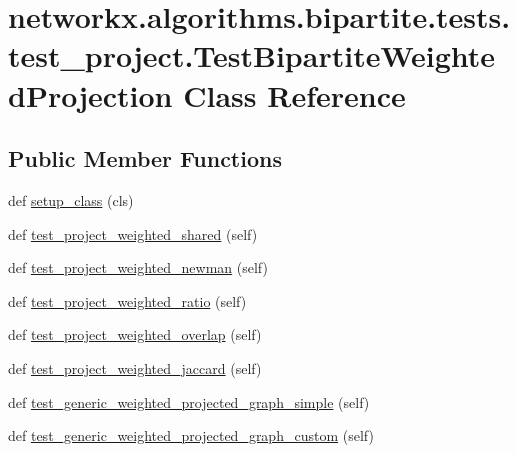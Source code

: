 \hypertarget{classnetworkx_1_1algorithms_1_1bipartite_1_1tests_1_1test__project_1_1TestBipartiteWeightedProjection}{}\section{networkx.\+algorithms.\+bipartite.\+tests.\+test\+\_\+project.\+Test\+Bipartite\+Weighted\+Projection Class Reference}
\label{classnetworkx_1_1algorithms_1_1bipartite_1_1tests_1_1test__project_1_1TestBipartiteWeightedProjection}
\subsection*{Public Member Functions}
\begin{DoxyCompactItemize}
\item 
def \hyperlink{classnetworkx_1_1algorithms_1_1bipartite_1_1tests_1_1test__project_1_1TestBipartiteWeightedProjection_a610c0d9618715508b26f3887442ea98f}{setup\+\_\+class} (cls)
\item 
def \hyperlink{classnetworkx_1_1algorithms_1_1bipartite_1_1tests_1_1test__project_1_1TestBipartiteWeightedProjection_a240fa8424533f59822daa34b510cb748}{test\+\_\+project\+\_\+weighted\+\_\+shared} (self)
\item 
def \hyperlink{classnetworkx_1_1algorithms_1_1bipartite_1_1tests_1_1test__project_1_1TestBipartiteWeightedProjection_a2d93e4b4a460a553d42eb93fb774aad6}{test\+\_\+project\+\_\+weighted\+\_\+newman} (self)
\item 
def \hyperlink{classnetworkx_1_1algorithms_1_1bipartite_1_1tests_1_1test__project_1_1TestBipartiteWeightedProjection_ad06b2350c4025d133dd1aef6fef7dac6}{test\+\_\+project\+\_\+weighted\+\_\+ratio} (self)
\item 
def \hyperlink{classnetworkx_1_1algorithms_1_1bipartite_1_1tests_1_1test__project_1_1TestBipartiteWeightedProjection_aa5d789d0419c5174a79a70762872547a}{test\+\_\+project\+\_\+weighted\+\_\+overlap} (self)
\item 
def \hyperlink{classnetworkx_1_1algorithms_1_1bipartite_1_1tests_1_1test__project_1_1TestBipartiteWeightedProjection_a4df9d179a94bc85e1b7096da74bd4e63}{test\+\_\+project\+\_\+weighted\+\_\+jaccard} (self)
\item 
def \hyperlink{classnetworkx_1_1algorithms_1_1bipartite_1_1tests_1_1test__project_1_1TestBipartiteWeightedProjection_a822e915fce2bb984599728656876e7bc}{test\+\_\+generic\+\_\+weighted\+\_\+projected\+\_\+graph\+\_\+simple} (self)
\item 
def \hyperlink{classnetworkx_1_1algorithms_1_1bipartite_1_1tests_1_1test__project_1_1TestBipartiteWeightedProjection_a6f3763f7c60109634991260c7a68d4ef}{test\+\_\+generic\+\_\+weighted\+\_\+projected\+\_\+graph\+\_\+custom} (self)
\end{DoxyCompactItemize}
